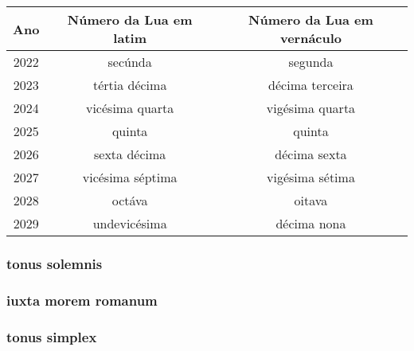 \label{appendix:kalenda}
\begin{center}
  \begin{tabular}{|c|c|c|}
    \hline
    Ano  & Número da Lua em latim & Número da Lua em vernáculo \\
    \hline
    \hline
    2022 & secúnda                & segunda                    \\
    2023 & tértia décima          & décima terceira            \\
    2024 & vicésima quarta        & vigésima quarta            \\
    2025 & quinta                 & quinta                     \\
    2026 & sexta décima           & décima sexta               \\
    2027 & vicésima séptima       & vigésima sétima            \\
    2028 & octáva                 & oitava                     \\
    2029 & undevicésima           & décima nona                \\
    \hline
    \hline
  \end{tabular}
\end{center}

\label{appendix:te-deum-simplex}

\subsubsection{tonus solemnis}

\subsubsection{iuxta morem romanum}

\subsubsection{tonus simplex}

\label{appendix:veni-creator-spiritus}
